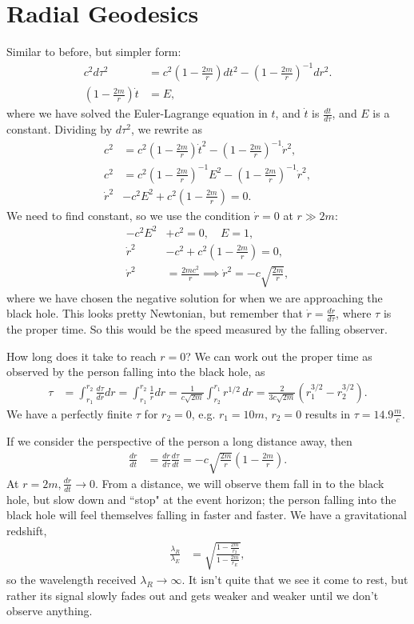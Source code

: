 \documentclass[a4paper, 11pt, normalem]{report}
\begin{document}
\section{Radial Geodesics}
Similar to before, but simpler form:
\begin{align}
    c^2d\tau^2 &= c^2\left(1-\frac{2m}{r}\right)dt^2 - \left(1-\frac{2m}{r}\right)^{-1}dr^2. \\
    \left(1-\frac{2m}{r}\right)\dot{t} &= E,
\end{align}
where we have solved the Euler-Lagrange equation in $t$, and $\dot{t}$ is $\frac{dt}{d\tau}$, and $E$ is a constant.
Dividing by $d\tau^2$, we rewrite as
\begin{align}
    c^2 &= c^2\left(1-\frac{2m}{r}\right)\dot{t}^2 - \left(1-\frac{2m}{r}\right)^{-1}\dot{r}^2, \\
    c^2 &= c^2\left(1-\frac{2m}{r}\right)^{-1}E^2 - \left(1-\frac{2m}{r}\right)^{-1}\dot{r}^2, \\
    \dot{r}^2 &- c^2E^2 + c^2\left(1-\frac{2m}{r}\right) = 0.
\end{align}
We need to find constant, so we use the condition $\dot{r}=0$ at $r\gg2m$:
\begin{align}
    -c^2E^2 &+ c^2 = 0, \quad E = 1, \\
    \dot{r}^2 &- c^2 + c^2\left(1-\frac{2m}{r}\right) = 0, \\
    \dot{r}^2 &= \frac{2mc^2}{r} \implies \dot{r}^2 = -c\sqrt{\frac{2m}{r}},
\end{align}
where we have chosen the negative solution for when we are approaching the black hole.
This looks pretty Newtonian, but remember that $\dot{r}=\frac{dr}{d\tau}$, where $\tau$ is the proper time.
So this would be the speed measured by the falling observer.

How long does it take to reach $r=0$?
We can work out the proper time as observed by the person falling into the black hole, as
\begin{align}
    \tau &= \int_{r_1}^{r_2} \frac{d\tau}{dr}dr = \int_{r_1}^{r_2} \frac{1}{\dot{r}}dr = \frac{1}{c\sqrt{2m}}\int_{r_2}^{r_1} r^{1/2}\,dr = \frac{2}{3c\sqrt{2m}}\left(r_1^{3/2} - r_2^{3/2}\right).
\end{align}
We have a perfectly finite $\tau$ for $r_2=0$, e.g. $r_1=10m$, $r_2=0$ results in $\tau=14.9\frac{m}{c}$.

If we consider the perspective of the person a long distance away, then
\begin{align}
    \frac{dr}{dt} &= \frac{dr}{d\tau}\frac{d\tau}{dt} = -c\sqrt{\frac{2m}{r}}\left(1-\frac{2m}{r}\right).
\end{align}
At $r=2m,\frac{dr}{dt}\to0$.
From a distance, we will observe them fall in to the black hole, but slow down and ``stop" at the event horizon; the person falling into the black hole will feel themselves falling in faster and faster.
We have a gravitational redshift,
\begin{align}
    \frac{\lambda_R}{\lambda_E} &= \sqrt{\frac{1-\frac{2m}{r_2}}{1-\frac{2m}{r_E}}},
\end{align}
so the wavelength received $\lambda_R\to\infty$.
It isn't quite that we see it come to rest, but rather its signal slowly fades out and gets weaker and weaker until we don't observe anything.
\end{document}
